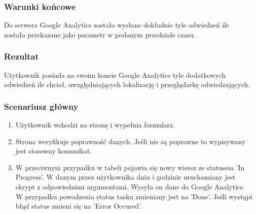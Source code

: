 \documentclass{article}
\begin{document}
\subsubsection{Warunki końcowe}
Do serwera Google Analytics zostało wysłane dokładnie tyle odwiedzeń ile zostało przekazane jako parametr w podanym przedziale czasu.

\subsubsection{Rezultat}
Użytkownik posiada na swoim koncie Google Analytics tyle dodatkowych odwiedzeń ile chciał, uwzględniających lokalizację i przeglądarkę odwiedzających.

\subsubsection{Scenariusz główny}
\begin{enumerate}
\item Użytkownik wchodzi na stronę i wypełnia formularz.
\item Strona weryfikuje poprawność danych. Jeśli nie są poprawne to wypisywany jest stosowny komunikat.
\item W przeciwnym przypadku w tabeli pojawia się nowy wiersz ze statusem 'In Progress'. W danym przez użytkownika dniu i godzinie uruchamiany jest skrypt z odpowiednimi argumentami. Wysyła on dane do Google Analytics. W przypadku powodzenia status tasku zmieniany jest na 'Done'. Jeśli wystąpi błąd status zmieni się na 'Error Occured'.
\end{enumerate}
\end{document}
